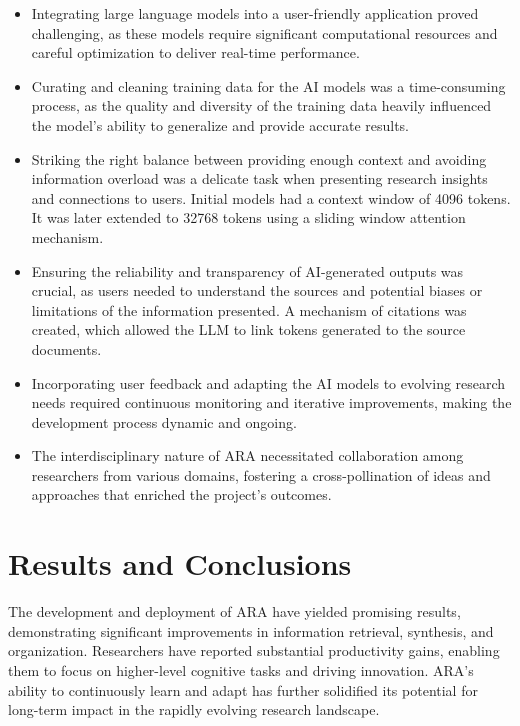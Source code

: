 \begin{itemize}
    \item Integrating large language models into a user-friendly application proved challenging, as these models require significant computational resources and careful optimization to deliver real-time performance.
    
    \item Curating and cleaning training data for the AI models was a time-consuming process, as the quality and diversity of the training data heavily influenced the model's ability to generalize and provide accurate results.
    
    \item Striking the right balance between providing enough context and avoiding information overload was a delicate task when presenting research insights and connections to users. Initial models had a context window of 4096 tokens. It was later extended to 32768 tokens using a sliding window attention mechanism.
    
    \item Ensuring the reliability and transparency of AI-generated outputs was crucial, as users needed to understand the sources and potential biases or limitations of the information presented. A mechanism of citations was created, which allowed the LLM to link tokens generated to the source documents.
    
    \item Incorporating user feedback and adapting the AI models to evolving research needs required continuous monitoring and iterative improvements, making the development process dynamic and ongoing.
    
    \item The interdisciplinary nature of ARA necessitated collaboration among researchers from various domains, fostering a cross-pollination of ideas and approaches that enriched the project's outcomes.
\end{itemize}


\section*{Results and Conclusions}
The development and deployment of ARA have yielded promising results, demonstrating significant improvements in information retrieval, synthesis, and organization. Researchers have reported substantial productivity gains, enabling them to focus on higher-level cognitive tasks and driving innovation. ARA's ability to continuously learn and adapt has further solidified its potential for long-term impact in the rapidly evolving research landscape.

